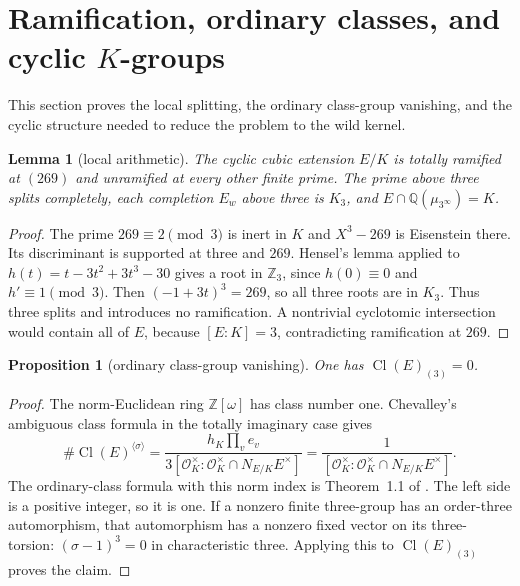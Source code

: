 \documentclass[11pt]{article}
\newtheorem{proposition}[theorem]{Proposition}
\newtheorem{lemma}[theorem]{Lemma}
\theoremstyle{remark}\newtheorem{remark}[theorem]{Remark}
\newcommand{\Z}{\mathbb Z}\newcommand{\Q}{\mathbb Q}\newcommand{\F}{\mathbb F}
\newcommand{\Oa}{\mathcal O}\newcommand{\Cl}{\operatorname{Cl}}
\begin{document}
\section{Ramification, ordinary classes, and cyclic \texorpdfstring{$K$}{K}-groups}
This section proves the local splitting, the ordinary class-group vanishing, and the cyclic structure needed to reduce the problem to the wild kernel.
\begin{lemma}[local arithmetic]
\label{lem:local}
The cyclic cubic extension $E/K$ is totally ramified at $(269)$ and unramified at every other finite prime.
The prime above three splits completely, each completion $E_w$ above three is $K_3$, and
$E\cap\Q(\mu_{3^\infty})=K$.
\end{lemma}
\begin{proof}
The prime $269\equiv2\pmod3$ is inert in $K$ and $X^3-269$ is Eisenstein there.
Its discriminant is supported at three and $269$.
Hensel's lemma applied to $h(t)=t-3t^2+3t^3-30$ gives a root in $\Z_3$, since $h(0)\equiv0$ and $h'\equiv1\pmod3$.
Then $(-1+3t)^3=269$, so all three roots are in $K_3$.
Thus three splits and introduces no ramification.
A nontrivial cyclotomic intersection would contain all of $E$, because $[E:K]=3$, contradicting ramification at $269$.
\end{proof}

\begin{proposition}[ordinary class-group vanishing]
\label{prop:classes}
One has $\Cl(E)_{(3)}=0$.
\end{proposition}
\begin{proof}
The norm-Euclidean ring $\Z[\omega]$ has class number one.
Chevalley's ambiguous class formula in the totally imaginary case gives
\[
 \#\Cl(E)^{\langle\sigma\rangle}
 =\frac{h_K\prod_v e_v}{3[\Oa_K^\times:\Oa_K^\times\cap N_{E/K}E^\times]}
 =\frac1{[\Oa_K^\times:\Oa_K^\times\cap N_{E/K}E^\times]}.
\]
The ordinary-class formula with this norm index is Theorem~1.1 of \citet{Yu2014}.
The left side is a positive integer, so it is one.
If a nonzero finite three-group has an order-three automorphism, that automorphism has a nonzero fixed vector on its three-torsion: $(\sigma-1)^3=0$ in characteristic three.
Applying this to $\Cl(E)_{(3)}$ proves the claim.
\end{proof}
\end{document}

